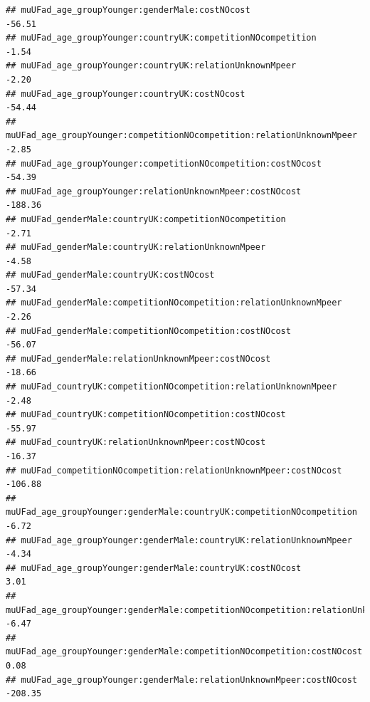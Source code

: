 \documentclass[
]{article}
\begin{document}
\begin{verbatim}
## muUFad_age_groupYounger:genderMale:costNOcost                                                            -56.51
## muUFad_age_groupYounger:countryUK:competitionNOcompetition                                                -1.54
## muUFad_age_groupYounger:countryUK:relationUnknownMpeer                                                    -2.20
## muUFad_age_groupYounger:countryUK:costNOcost                                                             -54.44
## muUFad_age_groupYounger:competitionNOcompetition:relationUnknownMpeer                                     -2.85
## muUFad_age_groupYounger:competitionNOcompetition:costNOcost                                              -54.39
## muUFad_age_groupYounger:relationUnknownMpeer:costNOcost                                                 -188.36
## muUFad_genderMale:countryUK:competitionNOcompetition                                                      -2.71
## muUFad_genderMale:countryUK:relationUnknownMpeer                                                          -4.58
## muUFad_genderMale:countryUK:costNOcost                                                                   -57.34
## muUFad_genderMale:competitionNOcompetition:relationUnknownMpeer                                           -2.26
## muUFad_genderMale:competitionNOcompetition:costNOcost                                                    -56.07
## muUFad_genderMale:relationUnknownMpeer:costNOcost                                                        -18.66
## muUFad_countryUK:competitionNOcompetition:relationUnknownMpeer                                            -2.48
## muUFad_countryUK:competitionNOcompetition:costNOcost                                                     -55.97
## muUFad_countryUK:relationUnknownMpeer:costNOcost                                                         -16.37
## muUFad_competitionNOcompetition:relationUnknownMpeer:costNOcost                                         -106.88
## muUFad_age_groupYounger:genderMale:countryUK:competitionNOcompetition                                     -6.72
## muUFad_age_groupYounger:genderMale:countryUK:relationUnknownMpeer                                         -4.34
## muUFad_age_groupYounger:genderMale:countryUK:costNOcost                                                    3.01
## muUFad_age_groupYounger:genderMale:competitionNOcompetition:relationUnknownMpeer                          -6.47
## muUFad_age_groupYounger:genderMale:competitionNOcompetition:costNOcost                                     0.08
## muUFad_age_groupYounger:genderMale:relationUnknownMpeer:costNOcost                                      -208.35

\end{verbatim}
\end{document}
